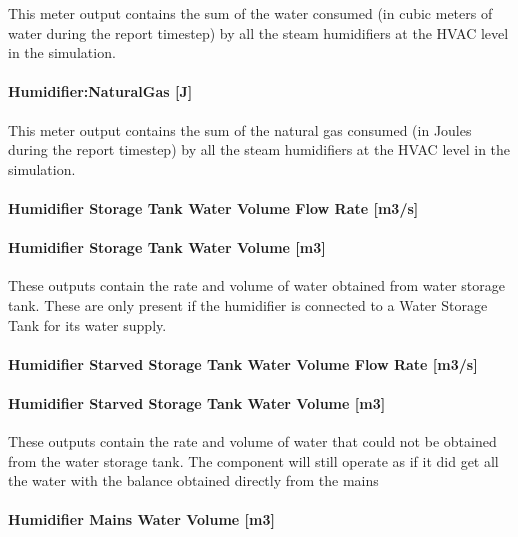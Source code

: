 This meter output contains the sum of the water consumed (in cubic meters of water during the report timestep) by all the steam humidifiers at the HVAC level in the simulation.

\paragraph{Humidifier:NaturalGas {[}J{]}}\label{humidifiernaturalgas-j}

This meter output contains the sum of the natural gas consumed (in Joules during the report timestep) by all the steam humidifiers at the HVAC level in the simulation.

\paragraph{Humidifier Storage Tank Water Volume Flow Rate {[}m3/s{]}}\label{humidifier-storage-tank-water-volume-flow-rate-m3s-1}

\paragraph{Humidifier Storage Tank Water Volume {[}m3{]}}\label{humidifier-storage-tank-water-volume-m3-1}

These outputs contain the rate and volume of water obtained from water storage tank. These are only present if the humidifier is connected to a Water Storage Tank for its water supply.

\paragraph{Humidifier Starved Storage Tank Water Volume Flow Rate {[}m3/s{]}}\label{humidifier-starved-storage-tank-water-volume-flow-rate-m3s-1}

\paragraph{Humidifier Starved Storage Tank Water Volume {[}m3{]}}\label{humidifier-starved-storage-tank-water-volume-m3-1}

These outputs contain the rate and volume of water that could not be obtained from the water storage tank. The component will still operate as if it did get all the water with the balance obtained directly from the mains

\paragraph{Humidifier Mains Water Volume {[}m3{]}}\label{humidifier-mains-water-volume-m3-1}

